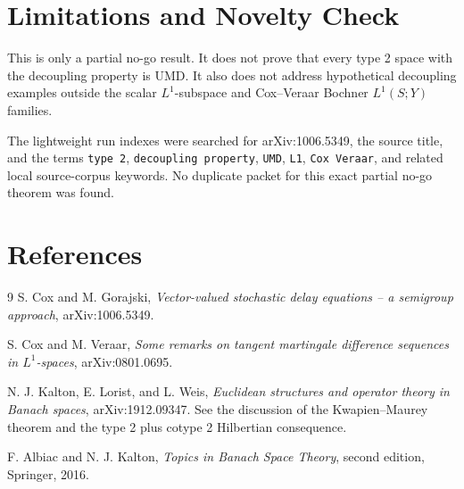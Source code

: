 \documentclass[11pt]{article}
\begin{document}
\section*{Limitations and Novelty Check}

This is only a partial no-go result.  It does not prove that every type 2 space
with the decoupling property is UMD.  It also does not address hypothetical
decoupling examples outside the scalar \(L^1\)-subspace and Cox--Veraar
Bochner \(L^1(S;Y)\) families.

The lightweight run indexes were searched for arXiv:1006.5349, the source
title, and the terms \texttt{type 2}, \texttt{decoupling property},
\texttt{UMD}, \texttt{L1}, \texttt{Cox Veraar}, and related local source-corpus
keywords.  No duplicate packet for this exact partial no-go theorem was found.

\section*{References}

\begin{thebibliography}{9}
S. Cox and M. Gorajski,
\emph{Vector-valued stochastic delay equations -- a semigroup approach},
arXiv:1006.5349.

S. Cox and M. Veraar,
\emph{Some remarks on tangent martingale difference sequences in
\(L^1\)-spaces}, arXiv:0801.0695.

N. J. Kalton, E. Lorist, and L. Weis,
\emph{Euclidean structures and operator theory in Banach spaces},
arXiv:1912.09347.  See the discussion of the Kwapien--Maurey theorem and the
type 2 plus cotype 2 Hilbertian consequence.

F. Albiac and N. J. Kalton,
\emph{Topics in Banach Space Theory}, second edition, Springer, 2016.
\end{thebibliography}
\end{document}
